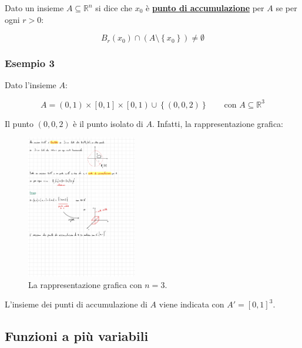 \documentclass[a4paper]{article}
\begin{document}
	\noindent
	Dato un insieme $A \subseteq \mathbb{R}^{n}$ si dice che $x_{0}$ è \textcolor{Red3}{\textbf{\underline{punto di accumulazione}}} per $A$ se per ogni $r > 0$:
	
	\begin{equation*}
		B_{r}\left(x_{0}\right) \cap \left(A \setminus \left\{x_{0}\right\}\right) \ne \emptyset
	\end{equation*}

	\subsubsection[Esempio 3]{\textcolor{Green4}{Esempio 3}}
	
	Dato l'insieme $A$:
	
	\begin{equation*}
		A = \left(0,1\right) \times \left[0,1\right] \times \left[0,1\right) \cup \left\{\left(0,0,2\right)\right\} \hspace{2em} \text{con } A \subseteq \mathbb{R}^{3}
	\end{equation*}

	\noindent
	Il punto $\left(0,0,2\right)$ è il punto isolato di $A$. Infatti, la rappresentazione grafica:
	
	\begin{figure}[!htp]
		\centering
		\includegraphics[width=0.43\textwidth]{img/esempio_insieme.pdf}
		\caption{La rappresentazione grafica con $n = 3$.}
	\end{figure}

	\noindent
	L'insieme dei punti di accumulazione di $A$ viene indicata con $A' = \left[0,1\right]^{3}$.
	
	\subsection{Funzioni a più variabili}
	
\end{document}
